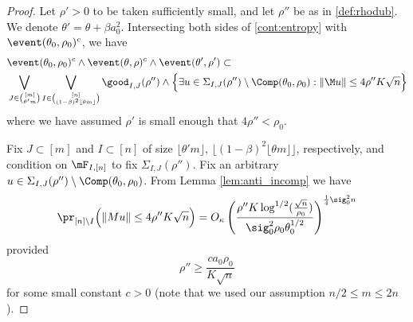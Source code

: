 \documentclass[aop,preprint]{imsart}
\theoremstyle{plain}
\theoremstyle{definition}
\theoremstyle{remark}
\numberwithin{equation}{section}
\numberwithin{theorem}{section}
\def \lf {\lfloor}
\def \rf {\rfloor}
\begin{document}
\begin{proof}
Let $\rho'>0$ to be taken sufficiently small, and let $\rho''$ be as in \eqref{def:rhodub}.
We denote $\theta'=\theta +\beta a_0^2$.
Intersecting both sides of \eqref{cont:entropy} with $\event(\theta_0,\rho_0)^c$, we have
\begin{align}
&\event(\theta_0,\rho_0)^c\wedge\event(\theta,\rho)^c \wedge \event(\theta',\rho') \subset \notag\\
&
\bigvee_{J\in {[m]\choose  \theta' m }} \bigvee_{I\in {[n]\choose (1-\beta)^2\lf \theta m\rf}}  \good_{I,J}(\rho'')
\wedge\Big\{ \exists u \in \Sigma_{I,J}(\rho'')\setminus \Comp(\theta_0,\rho_0): \|\M u\|\le 4\rho''K\sqrt{n} \Big\}	\label{unionIJ:gen}
\end{align}
where we have assumed $\rho'$ is small enough that $4\rho''<\rho_0$.

Fix $J\subset[m]$ and $I\subset[n]$ of size $\lf \theta'm\rf$, $\lf (1-\beta)^2\lf \theta m\rf\rf$, respectively, and condition on $\mF_{I,[n]}$ to fix $\Sigma_{I,J}(\rho'')$.
Fix an arbitrary $u\in \Sigma_{I,J}(\rho'')\setminus \Comp(\theta_0,\rho_0)$. 
From Lemma \ref{lem:anti_incomp} we have
\begin{equation}
\pr_{[n]\setminus I} \Big( \|Mu\| \le 4\rho'' K\sqrt{n} \Big) = O_\kappa\left(\frac{\rho'' K\log^{1/2}(\frac{\sqrt{n}}{\rho_0})}{\sig_0^2\rho_0 \theta_0^{1/2}}\right)^{\frac14\sig_0^2n}
\end{equation}
provided
\begin{equation}	\label{assume:rhodub}
\rho'' \ge \frac{c a_0\rho_0}{K\sqrt{n}}
\end{equation}
for some small constant $c>0$ (note that we used our assumption $n/2\le m\le 2n$). 


\end{proof}
\end{document}

